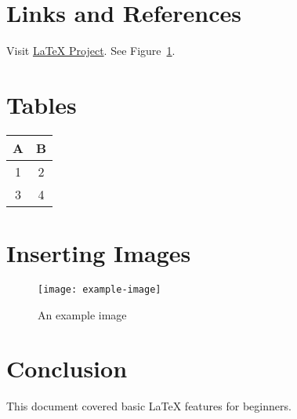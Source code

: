 \documentclass{article} %
\begin{document}
\section{Links and References} %
Visit \href{https://www.latex-project.org}{LaTeX Project}. %
See Figure~\ref{fig:example}. %

\section{Tables} %
\begin{tabular}{|c|c|} %
  \hline %
  A & B \\ %
  \hline %
  1 & 2 \\ %
  3 & 4 \\ %
  \hline %
\end{tabular} %

\section{Inserting Images} %
\begin{figure}[h] %
  \centering %
  \texttt{[image: example-image]} %
  \caption{An example image} %
  \label{fig:example} %
\end{figure} %

\section{Conclusion} %
This document covered basic LaTeX features for beginners. %
\end{document}
